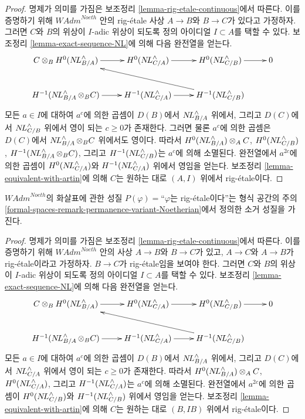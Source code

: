 \begin{proof}
명제가 의미를 가짐은 보조정리 \ref{lemma-rig-etale-continuous}에서 따른다.
이를 증명하기 위해 $\textit{WAdm}^{Noeth}$ 안의 rig-\'etale 사상
$A \to B$와 $B \to C$가 있다고 가정하자.
그러면 $C$와 $B$의 위상이 $I$-adic 위상이 되도록
정의 아이디얼 $I \subset A$를 택할 수 있다.
보조정리 \ref{lemma-exact-sequence-NL}에 의해 다음 완전열을 얻는다.
$$
\xymatrix{
C \otimes_B H^0(\NL_{B/A}^\wedge) \ar[r] &
H^0(\NL_{C/A}^\wedge) \ar[r] &
H^0(\NL_{C/B}^\wedge) \ar[r] & 0 \\
H^{-1}(\NL_{B/A}^\wedge \otimes_B C) \ar[r] &
H^{-1}(\NL_{C/A}^\wedge) \ar[r] &
H^{-1}(\NL_{C/B}^\wedge) \ar[llu]
}
$$
모든 $a \in I$에 대하여 $a^c$에 의한 곱셈이
$D(B)$에서 $\mathop{N\!L}\nolimits_{B/A}^\wedge$ 위에서, 그리고
$D(C)$에서 $\mathop{N\!L}\nolimits_{C/B}^\wedge$ 위에서 영이 되는 $c \geq 0$가 존재한다.
그러면 물론 $a^c$에 의한 곱셈은 $D(C)$에서
$\mathop{N\!L}\nolimits_{B/A}^\wedge \otimes_B C$ 위에서도 영이다. 따라서
$H^0(\mathop{N\!L}\nolimits_{B/A}^\wedge) \otimes_A C$,
$H^0(\mathop{N\!L}\nolimits_{C/B}^\wedge)$,
$H^{-1}(\mathop{N\!L}\nolimits_{B/A}^\wedge \otimes_B C)$, 그리고
$H^{-1}(\mathop{N\!L}\nolimits_{C/B}^\wedge)$는 $a^c$에 의해 소멸된다.
완전열에서 $a^{2c}$에 의한 곱셈이
$H^0(\mathop{N\!L}\nolimits_{C/A}^\wedge)$와 $H^{-1}(\mathop{N\!L}\nolimits_{C/A}^\wedge)$ 위에서
영임을 얻는다. 보조정리 \ref{lemma-equivalent-with-artin}에 의해
$C$는 원하는 대로 $(A, I)$ 위에서 rig-\'etale이다.
\end{proof}

\begin{lemma}
\label{lemma-permanence-rig-etale-continuous}
$\textit{WAdm}^{Noeth}$의 화살표에 관한 성질
$P(\varphi)=$``$\varphi$는 rig-\'etale이다''는 형식 공간의 주의
\ref{formal-spaces-remark-permanence-variant-Noetherian}에서 정의한
소거 성질을 가진다.
\end{lemma}

\begin{proof}
명제가 의미를 가짐은 보조정리 \ref{lemma-rig-etale-continuous}에서 따른다.
이를 증명하기 위해 $\textit{WAdm}^{Noeth}$ 안의 사상
$A \to B$와 $B \to C$가 있고, $A \to C$와 $A \to B$가
rig-\'etale이라고 가정하자. $B \to C$가 rig-\'etale임을 보여야 한다.
그러면 $C$와 $B$의 위상이 $I$-adic 위상이 되도록
정의 아이디얼 $I \subset A$를 택할 수 있다.
보조정리 \ref{lemma-exact-sequence-NL}에 의해 다음 완전열을 얻는다.
$$
\xymatrix{
C \otimes_B H^0(\NL_{B/A}^\wedge) \ar[r] &
H^0(\NL_{C/A}^\wedge) \ar[r] &
H^0(\NL_{C/B}^\wedge) \ar[r] & 0 \\
H^{-1}(\NL_{B/A}^\wedge \otimes_B C) \ar[r] &
H^{-1}(\NL_{C/A}^\wedge) \ar[r] &
H^{-1}(\NL_{C/B}^\wedge) \ar[llu]
}
$$
모든 $a \in I$에 대하여 $a^c$에 의한 곱셈이
$D(B)$에서 $\mathop{N\!L}\nolimits_{B/A}^\wedge$ 위에서, 그리고
$D(C)$에서 $\mathop{N\!L}\nolimits_{C/A}^\wedge$ 위에서 영이 되는 $c \geq 0$가 존재한다.
따라서 $H^0(\mathop{N\!L}\nolimits_{B/A}^\wedge) \otimes_A C$,
$H^0(\mathop{N\!L}\nolimits_{C/A}^\wedge)$, 그리고
$H^{-1}(\mathop{N\!L}\nolimits_{C/A}^\wedge)$는 $a^c$에 의해 소멸된다.
완전열에서 $a^{2c}$에 의한 곱셈이
$H^0(\mathop{N\!L}\nolimits_{C/B}^\wedge)$와 $H^{-1}(\mathop{N\!L}\nolimits_{C/B}^\wedge)$ 위에서
영임을 얻는다. 보조정리 \ref{lemma-equivalent-with-artin}에 의해
$C$는 원하는 대로 $(B, IB)$ 위에서 rig-\'etale이다.
\end{proof}

